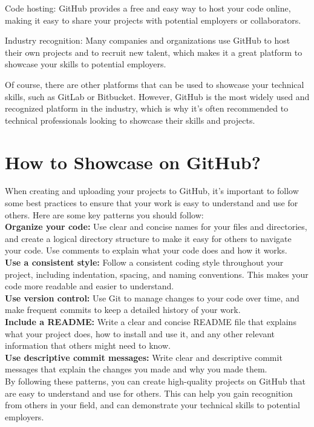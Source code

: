 \documentclass[12pt]{article}
\begin{document}
Code hosting: GitHub provides a free and easy way to host your code online, making it easy to share your projects with potential employers or collaborators.

Industry recognition: Many companies and organizations use GitHub to host their own projects and to recruit new talent, which makes it a great platform to showcase your skills to potential employers.

Of course, there are other platforms that can be used to showcase your technical skills, such as GitLab or Bitbucket. However, GitHub is the most widely used and recognized platform in the industry, which is why it's often recommended to technical professionals looking to showcase their skills and projects.
\section{How to Showcase on GitHub?}
When creating and uploading your projects to GitHub, it's important to follow some best practices to ensure that your work is easy to understand and use for others. Here are some key patterns you should follow:\\

\textbf{Organize your code:} Use clear and concise names for your files and directories, and create a logical directory structure to make it easy for others to navigate your code. Use comments to explain what your code does and how it works.\\

\textbf{Use a consistent style:} Follow a consistent coding style throughout your project, including indentation, spacing, and naming conventions. This makes your code more readable and easier to understand.\\

\textbf{Use version control:} Use Git to manage changes to your code over time, and make frequent commits to keep a detailed history of your work.\\

\textbf{Include a README:} Write a clear and concise README file that explains what your project does, how to install and use it, and any other relevant information that others might need to know.\\

\textbf{Use descriptive commit messages:} Write clear and descriptive commit messages that explain the changes you made and why you made them.\\

By following these patterns, you can create high-quality projects on GitHub that are easy to understand and use for others. This can help you gain recognition from others in your field, and can demonstrate your technical skills to potential employers.
\end{document}
